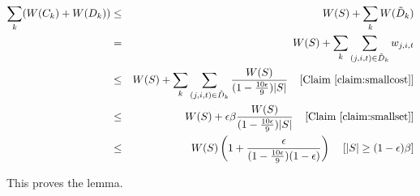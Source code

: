 \begin{eqnarray*}
\sum_k(W(C_k) + W(D_k)) &\leq& W(S) + \sum_k W(\tilde{D}_k )\\
&=& W(S) + \sum_k \sum_{(j,i,t) \in \tilde{D}_k} w_{j,i,t}\\
&\leq& W(S) + \sum_k \sum_{(j,i,t) \in \tilde{D}_k}  \frac{W(S)}{(1-\frac{10\epsilon}{9})|S|} \;\;\;\; \mbox{[Claim~\ref{claim:smallcost}]}\\
&\leq& W(S) + \epsilon \beta  \frac{W(S)}{(1-\frac{10\epsilon}{9})|S|} \;\;\;\; \mbox{[Claim~\ref{claim:smallset}]}\\
&\leq& W(S) \left (1 +  \frac{\epsilon}{(1-\frac{10\epsilon}{9})(1-\epsilon)} \right )\;\;\;\; \mbox{[$|S| \geq (1-\epsilon)\beta$]}\\
\end{eqnarray*} 

This proves the lemma.


